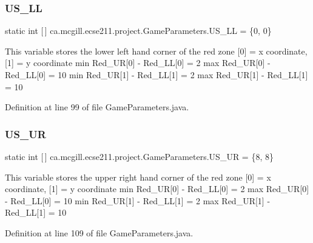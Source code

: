 \subsubsection{\texorpdfstring{U\+S\+\_\+\+LL}{US\_LL}}
{\footnotesize\ttfamily  static  int \mbox{[}$\,$\mbox{]} ca.\+mcgill.\+ecse211.\+project.\+Game\+Parameters.\+U\+S\+\_\+\+LL = \{0, 0\}\hspace{0.3cm}{\ttfamily [static]}}

This variable stores the lower left hand corner of the red zone \mbox{[}0\mbox{]} = x coordinate, \mbox{[}1\mbox{]} = y coordinate min Red\+\_\+\+UR\mbox{[}0\mbox{]} -\/ Red\+\_\+\+LL\mbox{[}0\mbox{]} = 2 max Red\+\_\+\+UR\mbox{[}0\mbox{]} -\/ Red\+\_\+\+LL\mbox{[}0\mbox{]} = 10 min Red\+\_\+\+UR\mbox{[}1\mbox{]} -\/ Red\+\_\+\+LL\mbox{[}1\mbox{]} = 2 max Red\+\_\+\+UR\mbox{[}1\mbox{]} -\/ Red\+\_\+\+LL\mbox{[}1\mbox{]} = 10 

Definition at line 99 of file Game\+Parameters.\+java.

\mbox{\label{enumca_1_1mcgill_1_1ecse211_1_1project_1_1_game_parameters_ab53ad7cced40d028fd0bbc3472cd2f8d}} 
\subsubsection{\texorpdfstring{U\+S\+\_\+\+UR}{US\_UR}}
{\footnotesize\ttfamily  static  int \mbox{[}$\,$\mbox{]} ca.\+mcgill.\+ecse211.\+project.\+Game\+Parameters.\+U\+S\+\_\+\+UR = \{8, 8\}\hspace{0.3cm}{\ttfamily [static]}}

This variable stores the upper right hand corner of the red zone \mbox{[}0\mbox{]} = x coordinate, \mbox{[}1\mbox{]} = y coordinate min Red\+\_\+\+UR\mbox{[}0\mbox{]} -\/ Red\+\_\+\+LL\mbox{[}0\mbox{]} = 2 max Red\+\_\+\+UR\mbox{[}0\mbox{]} -\/ Red\+\_\+\+LL\mbox{[}0\mbox{]} = 10 min Red\+\_\+\+UR\mbox{[}1\mbox{]} -\/ Red\+\_\+\+LL\mbox{[}1\mbox{]} = 2 max Red\+\_\+\+UR\mbox{[}1\mbox{]} -\/ Red\+\_\+\+LL\mbox{[}1\mbox{]} = 10 

Definition at line 109 of file Game\+Parameters.\+java.

